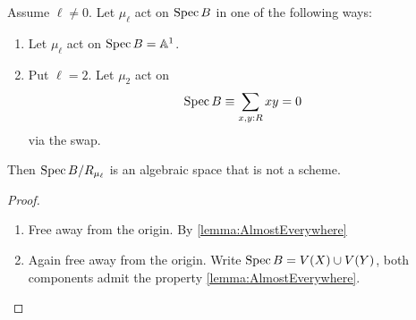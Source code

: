 \begin{example}
	Assume $\ell \neq 0$. Let $\mu_\ell$ act on $\operatorname{Spec} B$ in one of the following ways:
	\begin{enumerate}
		\item Let $\mu_\ell$ act on $\operatorname{Spec} B = \mathbb{A}^1$. 
		\item Put $\ell= 2$. Let $\mu_2$ act on
		\[
		\operatorname{Spec} B \equiv \sum_{x , y : R} x y = 0
		\]
		via the swap.
	\end{enumerate}
	Then $\operatorname{Spec} B / R_{\mu_\ell}$ is an algebraic space that is not a scheme.
\end{example}
\begin{proof}
	\begin{enumerate}
		\item Free away from the origin. By \ref{lemma:AlmostEverywhere} %
		\item  Again free away from the origin. Write $\operatorname{Spec} B = V(X) \cup V(Y)$, both components admit the property \ref{lemma:AlmostEverywhere}.
	\end{enumerate}
\end{proof}
